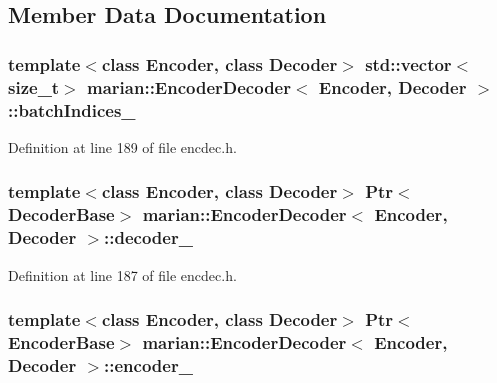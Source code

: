 \subsection{Member Data Documentation}
\subsubsection[{\texorpdfstring{batch\+Indices\+\_\+}{batchIndices_}}]{\setlength{\rightskip}{0pt plus 5cm}template$<$class Encoder, class Decoder$>$ std\+::vector$<$size\+\_\+t$>$ {\bf marian\+::\+Encoder\+Decoder}$<$ Encoder, Decoder $>$\+::batch\+Indices\+\_\+\hspace{0.3cm}{\ttfamily [protected]}}\hypertarget{classmarian_1_1EncoderDecoder_a7ca0d84733de420d7103df7a9e65b7ad}{}\label{classmarian_1_1EncoderDecoder_a7ca0d84733de420d7103df7a9e65b7ad}


Definition at line 189 of file encdec.\+h.

\subsubsection[{\texorpdfstring{decoder\+\_\+}{decoder_}}]{\setlength{\rightskip}{0pt plus 5cm}template$<$class Encoder, class Decoder$>$ {\bf Ptr}$<${\bf Decoder\+Base}$>$ {\bf marian\+::\+Encoder\+Decoder}$<$ Encoder, Decoder $>$\+::decoder\+\_\+\hspace{0.3cm}{\ttfamily [protected]}}\hypertarget{classmarian_1_1EncoderDecoder_a3e86046f2f51b1f2b146f366afea9c3b}{}\label{classmarian_1_1EncoderDecoder_a3e86046f2f51b1f2b146f366afea9c3b}


Definition at line 187 of file encdec.\+h.

\subsubsection[{\texorpdfstring{encoder\+\_\+}{encoder_}}]{\setlength{\rightskip}{0pt plus 5cm}template$<$class Encoder, class Decoder$>$ {\bf Ptr}$<${\bf Encoder\+Base}$>$ {\bf marian\+::\+Encoder\+Decoder}$<$ Encoder, Decoder $>$\+::encoder\+\_\+\hspace{0.3cm}{\ttfamily [protected]}}\hypertarget{classmarian_1_1EncoderDecoder_a31a65f97ea313106b7f560ffac52e969}{}\label{classmarian_1_1EncoderDecoder_a31a65f97ea313106b7f560ffac52e969}


